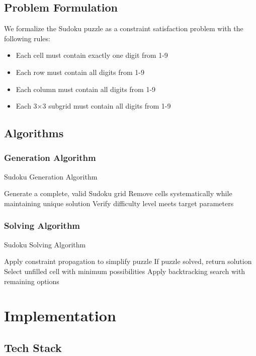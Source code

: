 \documentclass[12pt,a4paper]{article}
\begin{document}
\subsection{Problem Formulation}
We formalize the Sudoku puzzle as a constraint satisfaction problem with the following rules:
\begin{itemize}
    \item Each cell must contain exactly one digit from 1-9
    \item Each row must contain all digits from 1-9
    \item Each column must contain all digits from 1-9
    \item Each 3×3 subgrid must contain all digits from 1-9
\end{itemize}

\subsection{Algorithms}
\subsubsection{Generation Algorithm}
\begin{algorithm}
\caption{Sudoku Generation Algorithm}
\begin{algorithmic}[1]
\State Generate a complete, valid Sudoku grid
\State Remove cells systematically while maintaining unique solution
\State Verify difficulty level meets target parameters
\end{algorithmic}
\end{algorithm}

\subsubsection{Solving Algorithm}
\begin{algorithm}
\caption{Sudoku Solving Algorithm}
\begin{algorithmic}[1]
\State Apply constraint propagation to simplify puzzle
\State If puzzle solved, return solution
\State Select unfilled cell with minimum possibilities
\State Apply backtracking search with remaining options
\end{algorithmic}
\end{algorithm}

\section{Implementation}
\subsection{Tech Stack}
\end{document}
